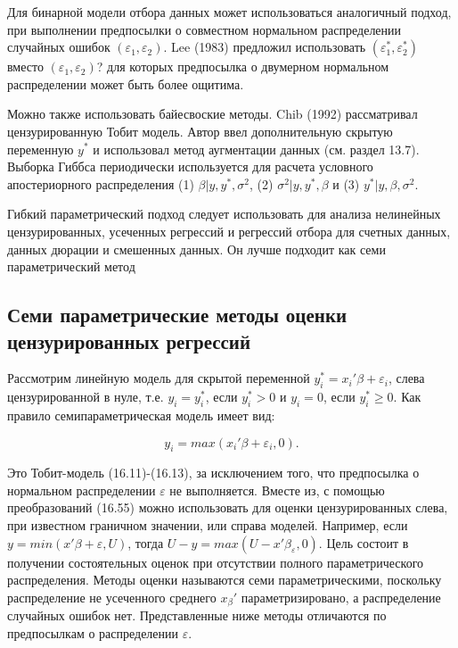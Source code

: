 Для бинарной модели отбора данных может использоваться аналогичный подход, при выполнении предпосылки о совместном нормальном распределении случайных ошибок $(\varepsilon_1,\varepsilon_2)$. Lee (1983) предложил использовать $(\varepsilon_1^{*},\varepsilon_2^{*})$ вместо $(\varepsilon_1,\varepsilon_2)$? для которых предпосылка о двумерном нормальном распределении может быть более ощитима. 

Можно также использовать байесвоские методы. Chib (1992) рассматривал цензурированную Тобит модель. Автор ввел дополнительную скрытую переменную $y^{*}$ и использовал метод аугментации данных (см. раздел 13.7). Выборка Гиббса периодически используется для расчета условного апостериорного распределения (1) $\beta|y,y^{*},\sigma^2$, (2) $\sigma^2|y,y^{*},\beta$ и (3) $y^{*}|y,\beta,\sigma^2$.

Гибкий параметрический подход следует использовать для анализа нелинейных цензурированных, усеченных регрессий и регрессий отбора для счетных данных, данных дюрации и смешенных данных.
Он лучше подходит как семи параметрический метод


\subsection{Семи параметрические методы оценки цензурированных регрессий}


Рассмотрим линейную модель для скрытой переменной $y_i^{*}=x_i'\beta+\varepsilon_i$, слева цензурированной в нуле, т.е. $y_i=y_i^{*}$, если $y_i^{*}>0$ и $y_i=0$, если $y_i^{*}{\geq}0$. Как правило семипараметрическая модель имеет вид:

\begin{equation}
y_i=max(x_i'\beta+\varepsilon_i,0).
\end{equation}

Это Тобит-модель (16.11)-(16.13), за исключением того, что предпосылка о нормальном распределении $\varepsilon$ не выполняется. Вместе из, с помощью преобразований (16.55) можно использовать для оценки цензурированных слева, при известном граничном значении, или справа моделей. Например, если $y=min(x'\beta+\varepsilon,U)$, тогда $U-y=max(U-x'\beta_\varepsilon,0)$. Цель состоит в получении состоятельных оценок при отсутствии полного параметрического распределения. Методы оценки называются семи параметрическими, поскольку распределение не усеченного среднего $x_\beta'$ параметризировано, а распределение случайных ошибок нет. Представленные ниже методы отличаются по предпосылкам о распределении $\varepsilon$. 

